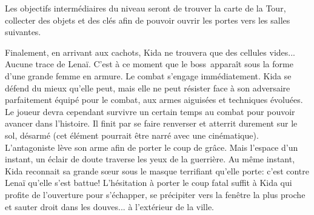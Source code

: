 Les objectifs intermédiaires du niveau seront de trouver la carte de la Tour, collecter des objets et des clés afin de pouvoir ouvrir les portes vers les salles suivantes.

Finalement, en arrivant aux cachots, Kida ne trouvera que des cellules vides... Aucune trace de Lenaï. C'est à ce moment que le boss\ apparaît sous la forme d'une grande femme en armure. Le combat s'engage immédiatement. Kida se défend du mieux qu'elle peut, mais elle ne peut résister face à son adversaire parfaitement équipé pour le combat, aux armes aiguisées et techniques évoluées. Le joueur devra cependant survivre un certain temps au combat pour pouvoir avancer dans l'histoire. Il finit par se faire renverser et atterrit durement sur le sol, désarmé (cet élément pourrait être narré avec une cinématique). L'antagoniste lève son arme afin de porter le coup de grâce. Mais l'espace d'un instant, un éclair de doute traverse les yeux de la guerrière. Au même instant, Kida reconnait sa grande s\oe ur sous le masque terrifiant qu'elle porte: c'est contre Lenaï qu'elle s'est battue! L'hésitation à porter le coup fatal suffit à Kida qui profite de l'ouverture pour s'échapper, se précipiter vers la fenêtre la plus proche et sauter droit dans les douves... à l'extérieur de la ville.



